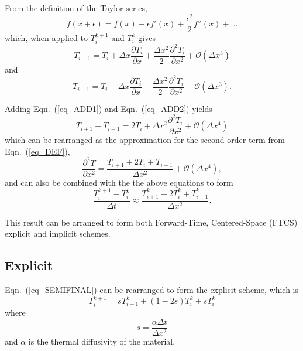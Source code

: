\documentclass[twocolumn,10pt]{asme2ej}
\begin{document}
From the definition of the Taylor series,
\begin{equation}
f(x+\epsilon) = f(x) + \epsilon f'(x) + \frac{\epsilon^2}{2} f''(x) + ...
\end{equation}
\noindent which, when applied to $T_{i}^{k+1}$  and $T_{i}^{k}$ gives
\begin{equation}
T_{i+1} = T_i + \Delta x \frac{\partial T_i}{\partial x} + \frac{\Delta x^2}{2} \frac{\partial^2 T_i}{\partial x^2} + \mathcal{O}(\Delta x^3)
\label{eq_ADD1}
\end{equation}
\noindent and
\begin{equation}
T_{i-1} = T_i - \Delta x \frac{\partial T_i}{\partial x} + \frac{\Delta x^2}{2} \frac{\partial^2 T_i}{\partial x^2} - \mathcal{O}(\Delta x^3).
\label{eq_ADD2}
\end{equation}

Adding Eqn.~(\ref{eq_ADD1}) and Eqn.~(\ref{eq_ADD2}) yields
\begin{equation}
T_{i+1} + T_{i-1} = 2T_i + \Delta x^2 \frac{\partial^2 T_i}{\partial x^2} + \mathcal{O}(\Delta x^4)
\end{equation}
\noindent which can be rearranged as the approximation for the second order term from Eqn.~(\ref{eq_DEF}),
\begin{equation}
\frac{\partial^2 T}{\partial x^2} = \frac{T_{i+1} + 2T_{i} + T_{i-1}}{\Delta x^2} + \mathcal{O}(\Delta x^4),
\end{equation}
\noindent and can also be combined with the the above equations to form
\begin{equation}
\frac{T_i^{k+1}-T_i^k}{\Delta t} \approx \frac{T_{i+1}^k - 2T_i^k + T_{i-1}^k}{\Delta x^2}.
\label{eq_SEMIFINAL}
\end{equation}

This result can be arranged to form both Forward-Time, Centered-Space (FTCS) explicit and implicit schemes.

\subsection{Explicit}
Eqn.~(\ref{eq_SEMIFINAL}) can be rearranged to form the explicit scheme, which is
\begin{equation}
T_i^{k+1} = sT_{i+1}^k +(1- 2s)T_i^k + sT_{i}^k
\end{equation}
\noindent where
\begin{equation}
s = \frac{\alpha \Delta t}{\Delta x^2}
\end{equation}
\noindent and $\alpha$ is the thermal diffusivity of the material.
\end{document}
